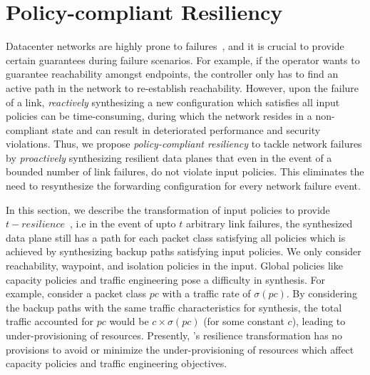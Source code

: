\section{Policy-compliant Resiliency}
\label{sec:resiliency}
Datacenter networks are highly prone to failures~\cite{datacenterfailures}, 
and it is crucial to provide certain guarantees during failure
scenarios. For example, if the operator wants to guarantee
reachability amongst endpoints, the controller only has to find an active
path in the network to re-establish reachability. 
However, upon the failure of a link, {\em reactively} synthesizing a new configuration which satisfies
all input policies can be time-consuming, during which
the network resides in a non-compliant state and can result 
in deteriorated performance and security violations. 
Thus, we propose 
\emph{policy-compliant resiliency} to tackle network failures
by \emph{proactively} synthesizing resilient data planes that even in the event
of a bounded number of link failures, do not violate input policies. This eliminates the 
need to resynthesize the forwarding
configuration for every network failure event.

In this section, we describe the transformation of input 
policies to provide $t-resilience$~\cite{plinko}, i.e in the event of upto $t$
arbitrary link failures, the synthesized data plane still has a path
for each packet class  satisfying all policies which is achieved
 by synthesizing
backup paths satisfying input policies.
We only consider reachability, waypoint,
and isolation policies in the input. 
Global policies like capacity policies
and traffic engineering pose a difficulty in synthesis. For example,
consider a packet class $pc$ with a traffic rate of $\sigma(pc)$. By considering
the backup paths with the same traffic characteristics for synthesis, 
the total traffic 
accounted for $pc$ would be $c\times \sigma(pc)$ (for some constant $c$), leading
to under-provisioning of resources. Presently, \name's resilience
transformation has no provisions to avoid or minimize 
the under-provisioning of resources which affect capacity policies
and traffic engineering objectives. 

